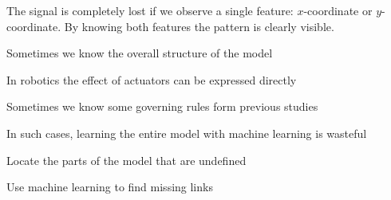 \documentclass[landscape,footrule]{foils}
\begin{document}


The signal is completely lost if we observe a single feature: $x$-coordinate or $y$-coordinate. By knowing both features the pattern is clearly visible.




Sometimes we know the overall structure of the model
\begin{triangles}
 \item In robotics the effect of actuators can be expressed directly
 \item Sometimes we know some governing rules form previous studies
\end{triangles} 
In such cases, learning the entire model with machine learning is wasteful
\begin{triangles}
 \item Locate the parts of the model that are undefined
 \item Use machine learning to find missing links 
\end{triangles} 
\end{document}
